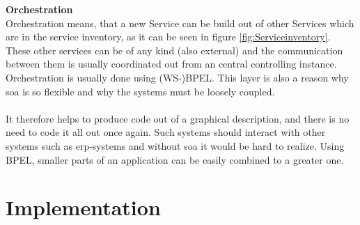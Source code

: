 \documentclass[12pt]{article}
\begin{document}
\textbf{Orchestration}\\
Orchestration means, that a new Service can be build out of other Services which are in the service inventory, as it can be seen in figure \ref{fig:Serviceinventory}. \\
These other services can be of any kind (also external) and the communication between them is usually coordinated out from an central controlling instance. Orchestration is usually done using (WS-)BPEL. This layer is also a reason why \gls{soa} is so flexible and why the systems must be loosely coupled. \cite[page 29]{soagoesreal}\\ \\
It therefore helps to produce code out of a graphical description, and there is no need to code it all out once again. Such systems should interact with other systems such as \gls{erp}-systems and without \gls{soa} it would be hard to realize. Using BPEL, smaller parts of an application can be easily combined to a greater one. \cite[page 18]{soagoesreal}
\newpage
\section{Implementation}
\end{document}
